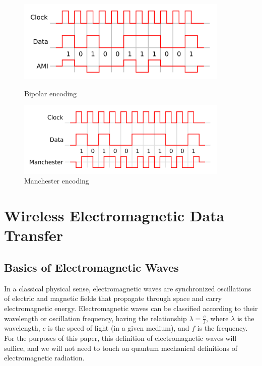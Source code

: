 \documentclass[11pt]{article}
\begin{document}
\begin{figure}[!htbp]
    \centering
    \begin{minipage}{0.45\textwidth}
        \centering
        \includegraphics[width=0.9\textwidth]{bipolarencoding.png}
        \caption{Bipolar encoding}
        \label{fig:bipolarencoding}
    \end{minipage}
    \begin{minipage}{0.45\textwidth}
        \centering
        \includegraphics[width=0.9\textwidth]{manchesterencoding.png}
        \caption{Manchester encoding}
        \label{fig:manchesterencoding}
    \end{minipage}
\end{figure}

\section{Wireless Electromagnetic Data Transfer}

\subsection{Basics of Electromagnetic Waves}

In a classical physical sense, electromagnetic waves are synchronized oscillations of electric and magnetic fields that propagate through space and carry electromagnetic energy. Electromagnetic waves can be classified according to their wavelength or oscillation frequency, having the relationship \begin{math} \lambda = \frac{c}{f} \end{math}, where \begin{math} \lambda \end{math} is the wavelength, \begin{math} c \end{math} is the speed of light (in a given medium), and \begin{math} f \end{math} is the frequency. For the purposes of this paper, this definition of electromagnetic waves will suffice, and we will not need to touch on quantum mechanical definitions of electromagnetic radiation. 
\end{document}
